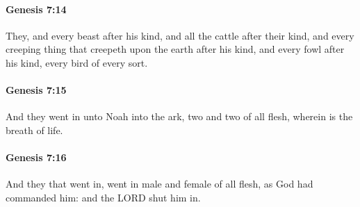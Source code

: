 		\paragraph{Genesis 7:14} %
			\label{GENESIS-7-14}

			They, and every beast after his kind, and all the cattle after their kind, and every creeping thing that creepeth upon the earth after his kind, and every fowl after his kind, every bird of every sort.


		\paragraph{Genesis 7:15} %
			\label{GENESIS-7-15}

			And they went in unto Noah into the ark, two and two of all flesh, wherein is the breath of life.


		\paragraph{Genesis 7:16} %
			\label{GENESIS-7-16}

			And they that went in, went in male and female of all flesh, as God had commanded him: and the LORD shut him in.


